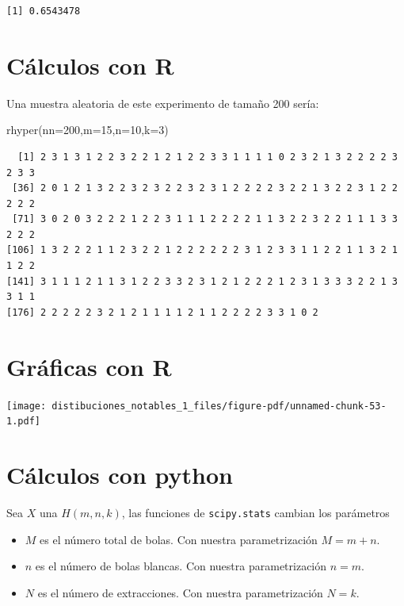 \documentclass[
  letterpaper,
  DIV=11,
  numbers=noendperiod]{scrreprt}
\newenvironment{Shaded}{\begin{snugshade}}{\end{snugshade}}
\newcommand{\AttributeTok}[1]{\textcolor[rgb]{0.40,0.45,0.13}{#1}}
\newcommand{\DecValTok}[1]{\textcolor[rgb]{0.68,0.00,0.00}{#1}}
\newcommand{\FunctionTok}[1]{\textcolor[rgb]{0.28,0.35,0.67}{#1}}
\newcommand{\NormalTok}[1]{\textcolor[rgb]{0.00,0.23,0.31}{#1}}
\providecommand{\tightlist}{%
  \setlength{\itemsep}{0pt}\setlength{\parskip}{0pt}}\usepackage{longtable,booktabs,array}
\begin{document}
\begin{verbatim}
[1] 0.6543478
\end{verbatim}

\section{Cálculos con R}\label{cuxe1lculos-con-r-11}

Una muestra aleatoria de este experimento de tamaño 200 sería:

\begin{Shaded}
\begin{Highlighting}[]
\FunctionTok{rhyper}\NormalTok{(}\AttributeTok{nn=}\DecValTok{200}\NormalTok{,}\AttributeTok{m=}\DecValTok{15}\NormalTok{,}\AttributeTok{n=}\DecValTok{10}\NormalTok{,}\AttributeTok{k=}\DecValTok{3}\NormalTok{)}
\end{Highlighting}
\end{Shaded}

\begin{verbatim}
  [1] 2 3 1 3 1 2 2 3 2 2 1 2 1 2 2 3 3 1 1 1 1 0 2 3 2 1 3 2 2 2 2 3 2 3 3
 [36] 2 0 1 2 1 3 2 2 3 2 3 2 2 3 2 3 1 2 2 2 2 3 2 2 1 3 2 2 3 1 2 2 2 2 2
 [71] 3 0 2 0 3 2 2 2 1 2 2 3 1 1 1 2 2 2 2 1 1 3 2 2 3 2 2 1 1 1 3 3 2 2 2
[106] 1 3 2 2 2 1 1 2 3 2 2 1 2 2 2 2 2 2 3 1 2 3 3 1 1 2 2 1 1 3 2 1 1 2 2
[141] 3 1 1 1 2 1 1 3 1 2 2 3 3 2 3 1 2 1 2 2 2 1 2 3 1 3 3 3 2 2 1 3 3 1 1
[176] 2 2 2 2 2 3 2 1 2 1 1 1 1 2 1 1 2 2 2 2 3 3 1 0 2
\end{verbatim}

\section{Gráficas con R}\label{gruxe1ficas-con-r}

\begin{center}
\texttt{[image: distibuciones\_notables\_1\_files/figure-pdf/unnamed-chunk-53-1.pdf]}
\end{center}

\section{Cálculos con python}\label{cuxe1lculos-con-python-10}

Sea \(X\) una \(H(m,n,k)\), las funciones de \texttt{scipy.stats}
cambian los parámetros

\begin{itemize}
\tightlist
\item
  \(M\) es el número total de bolas. Con nuestra parametrización
  \(M=m+n\).
\item
  \(n\) es el número de bolas blancas. Con nuestra parametrización
  \(n=m\).
\item
  \(N\) es el número de extracciones. Con nuestra parametrización
  \(N=k\).
\end{itemize}
\end{document}

